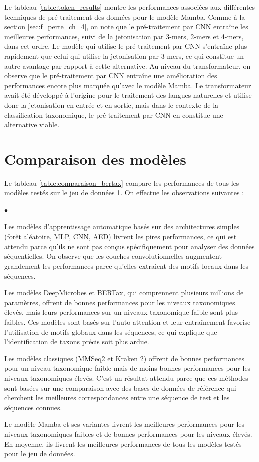 Le tableau \ref{table:token_results} montre les performances associées aux différentes techniques de
pré-traitement des données pour le modèle Mamba. Comme à la section \ref{sec:f_perte_ch_4}, on note
que le pré-traitement par CNN entraîne les meilleures performances, suivi de la jetonisation par
3-mers, 2-mers et 4-mers, dans cet ordre. Le modèle qui utilise le pré-traitement par CNN s'entraîne
plus rapidement que celui qui utilise la jetonisation par 3-mers, ce qui constitue un autre avantage
par rapport à cette alternative. Au niveau du transformateur, on observe que le pré-traitement par
CNN entraîne une amélioration des performances encore plus marquée qu'avec le modèle Mamba. Le
transformateur avait été développé à l'origine pour le traitement des langues naturelles
\cite{transformer} et utilise donc la jetonisation en entrée et en sortie, mais dans le contexte de
la classification taxonomique, le pré-traitement par CNN en constitue une alternative viable.

\section{Comparaison des modèles}
Le tableau \ref{table:comparaison_bertax} compare les performances de tous les modèles testés sur le
jeu de données 1. On effectue les observations suivantes :

\begin{list}{$\bullet$}{}
    \item Les modèles d'apprentissage automatique basés sur des architectures simples (forêt
        aléatoire, MLP, CNN, AED) livrent les pires performances, ce qui est attendu parce qu'ils
        ne sont pas conçus spécifiquement pour analyser des données séquentielles. On observe que
        les couches convolutionnelles augmentent grandement les performances parce qu'elles
        extraient des motifs locaux dans les séquences.
    \item Les modèles DeepMicrobes et BERTax, qui comprennent plusieurs millions de paramètres,
        offrent de bonnes performances pour les niveaux taxonomiques élevés, mais leurs performances
        sur un niveaux taxonomique faible sont plus faibles. Ces modèles sont basés sur
        l'auto-attention et leur entraînement favorise l'utilisation de motifs globaux dans les
        séquences, ce qui explique que l'identification de taxons précis soit plus ardue.
    \item Les modèles classiques (MMSeq2 et Kraken 2) offrent de bonnes performances pour un niveau
        taxonomique faible mais de moins bonnes performances pour les niveaux taxonomiques élevés.
        C'est un résultat attendu parce que ces méthodes sont basées sur une comparaison avec des
        bases de données de référence qui cherchent les meilleures correspondances entre une
        séquence de test et les séquences connues.
    \item Le modèle Mamba et ses variantes livrent les meilleures performances pour les niveaux
        taxonomiques faibles et de bonnes performances pour les niveaux élevés. En moyenne, ils
        livrent les meilleures performances de tous les modèles testés pour le jeu de données.
\end{list}

